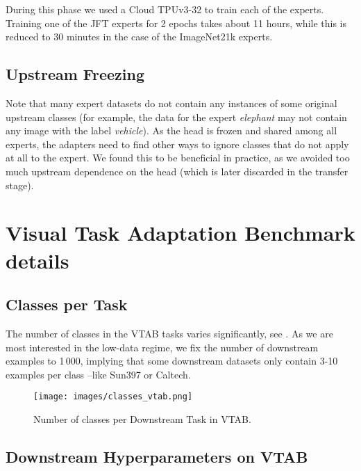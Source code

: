 \documentclass{article}
\newcommand{\JFT}{{JFT}\xspace}
\begin{document}
During this phase we used a Cloud TPUv3-32 to train each of the
experts. Training one of the \JFT experts for 2 epochs takes about 
11 hours, while this is reduced to 30 minutes in the case of the 
ImageNet21k experts.


\subsection{Upstream Freezing}

Note that many expert datasets  do not contain any instances of some original upstream classes (for example, the data for the expert \emph{elephant} may not contain any image with the label \emph{vehicle}).
As the head is frozen and shared among all experts, the adapters need to find other ways to ignore classes that do not apply at all to the expert.
We found this to be beneficial in practice, as we avoided too much upstream dependence on the head (which is later discarded in the transfer stage). \section{Visual Task Adaptation Benchmark details}
\label{sec:vtab_details}

\subsection{Classes per Task}
\label{sec:vtab_data_details}
The number of classes in the VTAB tasks varies significantly, see . 
As we are most interested in the low-data regime, we fix the number of downstream examples to 1\,000, implying that some downstream datasets only contain 3-10 examples per class --like Sun397 or Caltech. 


\begin{figure}[htb]
    \centering
  \texttt{[image: images/classes\_vtab.png]}
  \caption{Number of classes per Downstream Task in VTAB.}
  \label{fig:vtab_classes}
\end{figure}


\subsection{Downstream Hyperparameters on VTAB}
\label{subsec:vtab_hyperparams}
\end{document}

